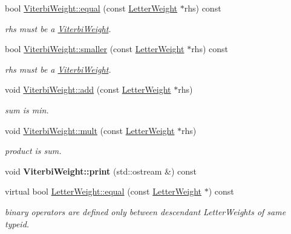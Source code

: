 \begin{DoxyCompactItemize}
\mbox{\label{group__weight_ga96f4c23e4845b232451e99b648bddfd6}} 
bool \mbox{\hyperlink{group__weight_ga96f4c23e4845b232451e99b648bddfd6}{Viterbi\+Weight\+::equal}} (const \mbox{\hyperlink{classLetterWeight}{Letter\+Weight}} $\ast$rhs) const
\begin{DoxyCompactList}\small\item\em rhs must be a \mbox{\hyperlink{classViterbiWeight}{Viterbi\+Weight}}. \end{DoxyCompactList}\item 
\mbox{\label{group__weight_ga54f4048f888a9432f02bc0d9f25257c1}} 
bool \mbox{\hyperlink{group__weight_ga54f4048f888a9432f02bc0d9f25257c1}{Viterbi\+Weight\+::smaller}} (const \mbox{\hyperlink{classLetterWeight}{Letter\+Weight}} $\ast$rhs) const
\begin{DoxyCompactList}\small\item\em rhs must be a \mbox{\hyperlink{classViterbiWeight}{Viterbi\+Weight}}. \end{DoxyCompactList}\item 
void \mbox{\hyperlink{group__weight_ga009b0216c58308f81497e4aabe49aaed}{Viterbi\+Weight\+::add}} (const \mbox{\hyperlink{classLetterWeight}{Letter\+Weight}} $\ast$rhs)
\begin{DoxyCompactList}\small\item\em sum is min. \end{DoxyCompactList}\item 
void \mbox{\hyperlink{group__weight_ga842377ca8ad5fa73cc9787fa97e88635}{Viterbi\+Weight\+::mult}} (const \mbox{\hyperlink{classLetterWeight}{Letter\+Weight}} $\ast$rhs)
\begin{DoxyCompactList}\small\item\em product is sum. \end{DoxyCompactList}\item 
\mbox{\label{group__weight_gad54ea0c48179932f2b8e553f5e3ade51}} 
void {\bfseries Viterbi\+Weight\+::print} (std\+::ostream \&) const
\item 
\mbox{\label{group__weight_gaf00322921db3c5212f8d5ca63081d689}} 
virtual bool \mbox{\hyperlink{group__weight_gaf00322921db3c5212f8d5ca63081d689}{Letter\+Weight\+::equal}} (const \mbox{\hyperlink{classLetterWeight}{Letter\+Weight}} $\ast$) const
\begin{DoxyCompactList}\small\item\em binary operators are defined only between descendant Letter\+Weights of same typeid. \end{DoxyCompactList}\item 

\end{DoxyCompactItemize}
